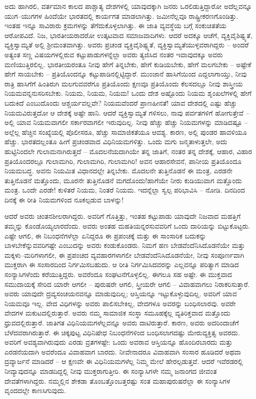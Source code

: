 ಅದು ಹಾಗಿರಲಿ, ವರ್ತಮಾನ ಕಾಲದ ಪಾಶ್ಚಾತ್ಯ ದೇಶಗಳಲ್ಲಿ ಯಾವುದಕ್ಕಾಗಿ ಜನರು ಒರಲಿಡುತ್ತಿದ್ದಾರೋ ಅದೆಲ್ಲವನ್ನೂ ಯುಗ–ಯುಗಗಳ ಹಿಂದೆಯೇ ಭಾರತದಲ್ಲಿ ಕಾರ್ಯಗತ ಮಾಡಲಾಗಿತ್ತು. ಜಮೀನೆಲ್ಲವೂ ರಾಷ್ಟ್ರೀಕರಣಗೊಂಡಿತ್ತು. ಇಂತಹ ಇನ್ನೂ ಸಾವಿರಾರು ಕ್ರಮಗಳನ್ನು ತೆಗೆದುಕೊಳ್ಳಲಾಗಿತ್ತು. ಈ ಜಾತಿ ವ್ಯವಸ್ಥೆಯ ಬಗ್ಗೆ ಸಂಕುಚಿತತೆಯ ಆರೋಪವಿದೆ. ನಿಜ, ಭಾರತೀಯರಾದರೋ ಉತ್ಕಟವಾದ ಸಮಾಜವಾದಿಗಳು. ಆದರೆ ಅದಕ್ಕೂ ಆಚೆಗೆ, ವ್ಯಕ್ತಿವೈಶಿಷ್ಟ್ಯತೆ, ವ್ಯಕ್ತಿಸ್ವಾಮ್ಯತೆ ಅಲ್ಲಿ ಶ‍್ರೀಮಂತವಾಗಿತ್ತು. ಅವರು ಪ್ರಚಂಡ ವ್ಯಕ್ತಿವೈಶಿಷ್ಟ್ಯತೆ, ವ್ಯಕ್ತಿಸ್ವಾಮ್ಯತೆಯುಳ್ಳವರಾಗಿದ್ದರು – ಅಂದರೆ ಅತ್ಯಂತ ಸಣ್ಣ ವಿಷಯಗಳಲ್ಲಿರುವ ಕಟ್ಟುಪಾಡುಗಳನ್ನೆಲ್ಲಾ ಅವರು ತ್ಯಜಿಸಿದ ನಂತರ ಇವಾವುದಕ್ಕೂ ಅವರು ಮಣಿಯುತ್ತಿರಲಿಲ್ಲ. ಭಾರತೀಯರಂತೂ ನೀವು ಹೇಗೆ ತಿನ್ನಬೇಕು, ಹೇಗೆ ಕುಡಿಯಬೇಕು, ಹೇಗೆ ಮಲಗಬೇಕು – ಅಷ್ಟೇಕೆ ಹೇಗೆ ಸಾಯಬೇಕು – ಪ್ರತಿಯೊಂದನ್ನೂ ಕಟ್ಟುಪಾಡಿನಲ್ಲಿಟ್ಟಿದ್ದಾರೆ. ಮುಂಜಾನೆ ಹಾಸಿಗೆಯಿಂದ ಎದ್ದಲಾಗಾಯ್ತು, ನೀವು ರಾತ್ರಿ ಹಾಸಿಗೆಗೆ ಹಿಂತಿರುಗಿ ಮಲಗುವವರೆಗೂ ಪ್ರತಿಯೊಂದು ಕ್ಷಣವೂ ಪ್ರತಿಯೊಂದು ಕೆಲಸದಲ್ಲೂ ನೀವು ಶಾಸ್ತ್ರೀಯ ನಿಯಮವನ್ನನುಸರಿಸಬೇಕು. ನಿಯಮ, ನಿಯಮ, ನಿಯಮ! ಒಂದು ದೇಶ ಅಷ್ಟೊಂದು ನಿಯಮ ಶೃಂಖಲೆಗಳಲ್ಲಿ ಹೇಗೆ ಬದುಕಿದೆ ಎಂಬುದೊಂದು ಆಶ್ಚರ್ಯವಲ್ಲವೇ? ನಿಯಮವೆಂದರೆ ಪ್ರಾಣಹೀನತೆ! ಯಾವ ದೇಶದಲ್ಲಿ ಎಷ್ಟು ಹೆಚ್ಚು ನಿಯಮವಿರುತ್ತದೋ ಆ ದೇಶಕ್ಕೆ ಅಷ್ಟೇ ಹಾನಿ. ಆದರೆ ವ್ಯಕ್ತಿಸ್ವಾಮ್ಯತೆ ಗಳಿಸಲು, ನಾವು ಪರ್ವತಗಳಿಗೆ ಹೋಗುತ್ತೇವೆ – ಅಲ್ಲಿ ಯಾವ ನಿಯಮವಾಗಲೀ ಸರ್ಕಾರವಾಗಲೀ ಇರುವುದಿಲ್ಲ. ನೀವು ಹೆಚ್ಚು ಹೆಚ್ಚು ನಿಯಮಗಳನ್ನು ಮಾಡಿದಷ್ಟೂ – ಅಲ್ಲೆಲ್ಲ ಹೆಚ್ಚಿನ ಸಂಖ್ಯೆಯಲ್ಲಿ ಪೊಲೀಸರೂ, ಹೆಚ್ಚು ಸಾಮಾಜಿಕತೆಯೂ ಆವಶ್ಯ. ಕಾರಣ, ಅಲ್ಲಿ ಪುಂಡರ ಹಾವಳಿಯೂ ಹೆಚ್ಚು. ಭಾರತದಲ್ಲಂತೂ ಹೀಗೆ ಪ್ರಚಂಡವಾದ ವಿಧಿನಿಯಮಗಳಿತ್ತು. ಒಂದು ಮಗು ಜನ್ಮತಾಳುತ್ತಲೇ, ಅದು ಹುಟ್ಟಿನಿಂದಲೇ ಗುಲಾಮನಾಗಿರುತ್ತದೆ – ಮೊದಲನೆಯದಾಗಿಯೇ ತನ್ನ ಜಾತಿಗೆ, ನಂತರ ತನ್ನ ದೇಶಕ್ಕೆ, ಆಹಾರ, ವಿಹಾರ ಪ್ರತಿಯೊಂದರಲ್ಲೂ ಗುಲಾಮಗಿರಿ, ಗುಲಾಮಗಿರಿ, ಗುಲಾಮಗಿರಿ! ಅವನ ಆಹಾರಸೇವನೆ, ಪಾನೀಯ ಪ್ರತಿಯೊಂದೂ ನಿಯಮಬದ್ಧ. ಅವನು ನಿಯಮಿತ ವಿಧಾನದಲ್ಲೇ ತಿನ್ನಬೇಕು. ಮೊದಲನೇ ತುತ್ತಿನೊಡನೆ ಈ ಮಂತ್ರ, ಎರಡನೇ ತುತ್ತಿನೊಡನೆ ಮತ್ತೊಂದು, ಮೂರನೇ ತುತ್ತಿನೊಡನೆ ಮಗದೊಂದು!ಹಾಗೆಯೇ ನೀರು ಕುಡಿಯುವಾಗ ಮತ್ತೊಂದು ಮಂತ್ರ. ಒಂದೇ ಎರಡೇ! ಕುಳಿತರೆ ನಿಯಮ, ನಿಂತರೆ ನಿಯಮ. ಇದನ್ನೆಲ್ಲಾ ಸ್ವಲ್ಪ ಪರಿಭಾವಿಸಿ – ನೋಡಿ. ದಿನದಿಂದ ದಿನಕ್ಕೆ ಈ ರೀತಿ ನಿಯಮಗಳಿಂದ ನೂಕಲ್ಪಡುವ ಬಾಳನ್ನು!

ಆದರೆ ಅವರು ಚಿಂತನಶೀಲರಾಗಿದ್ದರು. ಅವರಿಗೆ ಗೊತ್ತಿತ್ತು, ಇಂತಹ ಕಟ್ಟುಪಾಡು ಯಾವುದೇ ನಿಜವಾದ ಮಹತ್ತಿಗೆ ತಮ್ಮನ್ನು ಕೊಂಡೊಯ್ಯಲಾರದೆಂದು. ಅವರು ಅಂತಹ ಮಹತಿಯನ್ನರಸುವವರಿಗೆ ಒಂದು ದಾರಿಯನ್ನು ಬಿಟ್ಟುಕೊಟ್ಟರು. ಎಷ್ಟೇ ಆಗಲಿ, ಈ ನಿಬಂಧನೆಗಳೆಲ್ಲಾ ಏನಿದ್ದರೂ ಈ ಪ್ರಪಂಚಕ್ಕೆ ಮತ್ತು ಈ ಸಾಂಸಾರಿಕ ಬದುಕನ್ನು ಬಾಳಬೇಕೆನ್ನುವವರಿಗಷ್ಟೇ ಎಂಬುದನ್ನು ಅವರು ಕಂಡುಕೊಂಡರು. ನಿಮಗೆ ಹಣ ಬೇಡವೆಂದೆನಿಸಿದೊಡನೆಯೇ ಮತ್ತು ಮಕ್ಕಳು–ಮರಿಗಳಾಗಲೀ, ಈ ಪ್ರಪಂಚದ ವ್ಯವಹಾರಗಳಾಗಲೀ ಬೇಡವೆಂದೆನಿಸಿದೊಡನೆಯೇ, ನೀವು ಸಂಪೂರ್ಣವಾಗಿ ಮುಕ್ತರಾಗಿ ಈ ಸಂಸಾರದಿಂದ ನಿರ್ಗಮಿಸಬಹುದು. ಆ ರೀತಿ ನಿರ್ಗಮಿಸಿದವರನ್ನು ಎಲ್ಲವನ್ನೂ ಪರಿತ್ಯಾಗ ಮಾಡಿದ ಸಂನ್ಯಾಸಿಗಳೆಂದು ಕರೆಯುತ್ತಿದ್ದರು. ಅವರೆಂದೂ ಸಂಘಟನೆಗೊಳ್ಳಲಿಲ್ಲ. ಈಗಲೂ ಸಹ ಅಷ್ಟೇ. ಈ ಮುಕ್ತವಾದ ಸಮುದಾಯಕ್ಕೆ ಸೇರಿದ ಯಾರೇ ಆಗಲೀ – ಪುರುಷರೇ ಆಗಲಿ, ಸ್ತ್ರೀಯರೇ ಆಗಲಿ – ವಿವಾಹವಾಗಲು ನಿರಾಕರಿಸುತ್ತಾರೆ. ಅವರು ಯಾವುದೇ ದ್ರವ್ಯಸಂಚಯನವನ್ನೂ ಮಾಡುವುದಿಲ್ಲ; ಆಸ್ತಿಯನ್ನೂ ಇಟ್ಟುಕೊಳ್ಳುವುದಿಲ್ಲ. ಅವರಿಗೆ ಯಾವ ನಿಯಮವೂ ಇಲ್ಲ. ವೇದ ವಿಧಿಗಳನ್ನು ಅವರು ಪಾಲಿಸಬೇಕಿಲ್ಲ, ವೇದಗಳೂ ಅವರನ್ನು ಬಂಧಿಸಲಾರವು. ಅವರೇ ವೇದಗಳ ಮಕುಟದಲ್ಲಿರುತ್ತಾರೆ. ಅವರು ನಮ್ಮ ಸಾಮಾಜಿಕ ಸಂಸ್ಥಾ ಸಮೂಹಕ್ಕೆಲ್ಲ ವ್ಯತಿರಿಕ್ತವಾದ ಮತ್ತೊಂದು ಧ್ರುವದಲ್ಲಿರುತ್ತಾರೆ. ಜಾತಿಗತ ವಿಧಿನಿಯಮಗಳೆಲ್ಲವನ್ನೂ ಅವರು ದಾಟಿರುತ್ತಾರೆ. ಕಾರಣ, ಅವರು ಅದರಿಂದಾಚೆಗೆ ಬೆಳೆದವರಾಗಿರುತ್ತಾರೆ. ಈ ಚಿಕ್ಕಪುಟ್ಟ ವಿಧಿನಿಷೇಧ ನಿಬಂಧನೆಗಳಿಂದ ಬಂಧಿಸಲಾಗದಷ್ಟು ಮೇರುವ್ಯಕ್ತಿತ್ವ ಅವರದು. ಅವರಿಗೆ ಅವಶ್ಯವಾಗಿರುವುದು ಎರಡು ವ್ರತಗಳಷ್ಟೇ: ಒಂದು ಅವರಾವ ಆಸ್ತಿಯನ್ನೂ ಹೊಂದಿರಬಾರದು ಮತ್ತು ಎರಡನೆಯದಾಗಿ ಅವರೆಂದೂ ವಿವಾಹವಾಗ ಬಾರದು. ನೀವೇನಾದರೂ ವಿವಾಹವಾಗಿ ಸಂಸಾರ ಹೂಡಿದರೆ ಅಥವಾ ದ್ರವ್ಯಾರ್ಜನೆ ಮಾಡಿದರೆ – ಆ ಕ್ಷಣವೇ ಈ ವಿಧಿನಿಯಮಗಳೆಲ್ಲ ನಿಮ್ಮ ಮೇಲೆ ಹೇರಲ್ಪಡುತ್ತವೆ. ಆದರೆ ಇವೆರಡರಲ್ಲಿ ನೀವ್ಯಾವುದನ್ನೂ ಮಾಡದಿದ್ದಲ್ಲಿ ನೀವು ಮುಕ್ತರಾಗುತ್ತೀರಿ. ಈ ಸಂನ್ಯಾಸಿಗಳೇ ನಮ್ಮ ಜನಾಂಗದ ಜೀವಂತ ದೇವತೆಗಳಾಗಿದ್ದರು. ನಮ್ಮಲ್ಲಿನ ಶೇಕಡಾ ತೊಂಬತ್ತೊಂಬತ್ತರಷ್ಟು ಸಂತ ಮಹಾಪುರುಷರೆಲ್ಲಾ ಈ ಸಂನ್ಯಾಸಿಗಳ ವೃಂದದಲ್ಲೇ ಕಾಣಸಿಗುವುದು.

